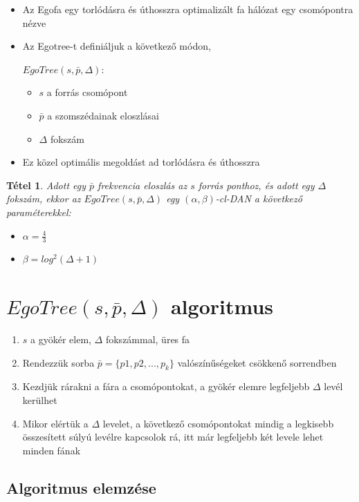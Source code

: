 \documentclass[12pt]{report}
\newtheorem{mytetel}{Tétel}
\begin{document}
\begin{itemize}
	\item Az Egofa egy torlódásra és úthosszra optimalizált fa hálózat egy csomópontra nézve
	\item Az Egotree-t definiáljuk a következő módon, 
	
	\(EgoTree(s, \bar{p}, \Delta) \):
	\begin{itemize}
		\item \(s\) a forrás csomópont
		\item \(\bar{p}\) a szomszédainak eloszlásai
		\item \(\Delta\) fokszám
	\end{itemize}
	\item Ez közel optimális megoldást ad torlódásra és úthosszra
\end{itemize}

\begin{mytetel}
	Adott egy  \(\bar{p}\) frekvencia eloszlás az \(s\) forrás ponthoz, és adott egy \(\Delta\) fokszám, ekkor az \(EgoTree(s, \bar{p}, \Delta)\) egy \((\alpha, \beta)\)-cl-DAN a következő paraméterekkel:
	\begin{itemize}
		\item \(\alpha = \frac{4}{3}\)
		\item \(\beta = log^2(\Delta + 1)\)
	\end{itemize}
\end{mytetel}

\section{\(EgoTree(s, \bar{p}, \Delta)\) algoritmus}

\begin{enumerate}
	\item \(s\) a gyökér elem, \(\Delta\) fokszámmal, üres fa
	\item Rendezzük sorba \(\bar{p} = \{p1, p2, ..., p_k\}\) valószínűségeket csökkenő sorrendben
	\item Kezdjük rárakni a fára a csomópontokat, a gyökér elemre legfeljebb \(\Delta\) levél kerülhet
	\item Mikor elértük a \(\Delta\) levelet, a következő csomópontokat mindig a legkisebb összesített súlyú levélre kapcsolok rá, itt már legfeljebb két levele lehet minden fának
\end{enumerate}

\subsection{Algoritmus elemzése}
\end{document}
